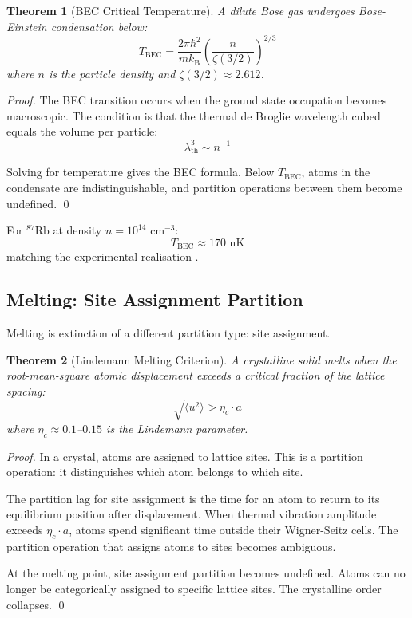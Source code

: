 \documentclass[twocolumn,10pt,aps,prd,superscriptaddress,nofootinbib]{revtex4-2}
\newtheorem{theorem}{Theorem}[section]
\theoremstyle{remark}
\newcommand{\kB}{k_{\mathrm{B}}}
\begin{document}
\begin{theorem}[BEC Critical Temperature]
\label{thm:bec}
A dilute Bose gas undergoes Bose-Einstein condensation below:
\begin{equation}
T_{\text{BEC}} = \frac{2\pi\hbar^2}{m \kB} \left(\frac{n}{\zeta(3/2)}\right)^{2/3}
\label{eq:T_BEC}
\end{equation}
where $n$ is the particle density and $\zeta(3/2) \approx 2.612$.
\end{theorem}

\begin{proof}
The BEC transition occurs when the ground state occupation becomes macroscopic. The condition is that the thermal de Broglie wavelength cubed equals the volume per particle:
\begin{equation}
\lambda_{\text{th}}^3 \sim n^{-1}
\end{equation}

Solving for temperature gives the BEC formula. Below $T_{\text{BEC}}$, atoms in the condensate are indistinguishable, and partition operations between them become undefined. \qed
\end{proof}

For $^{87}$Rb at density $n = 10^{14}$ cm$^{-3}$:
\begin{equation}
T_{\text{BEC}} \approx 170 \text{ nK}
\end{equation}
matching the experimental realisation \cite{anderson1995}.

\subsection{Melting: Site Assignment Partition}

Melting is extinction of a different partition type: site assignment.

\begin{theorem}[Lindemann Melting Criterion]
\label{thm:lindemann}
A crystalline solid melts when the root-mean-square atomic displacement exceeds a critical fraction of the lattice spacing:
\begin{equation}
\sqrt{\langle u^2 \rangle} > \eta_c \cdot a
\label{eq:lindemann}
\end{equation}
where $\eta_c \approx 0.1$--$0.15$ is the Lindemann parameter.
\end{theorem}

\begin{proof}
In a crystal, atoms are assigned to lattice sites. This is a partition operation: it distinguishes which atom belongs to which site.

The partition lag for site assignment is the time for an atom to return to its equilibrium position after displacement. When thermal vibration amplitude exceeds $\eta_c \cdot a$, atoms spend significant time outside their Wigner-Seitz cells. The partition operation that assigns atoms to sites becomes ambiguous.

At the melting point, site assignment partition becomes undefined. Atoms can no longer be categorically assigned to specific lattice sites. The crystalline order collapses. \qed
\end{proof}
\end{document}
